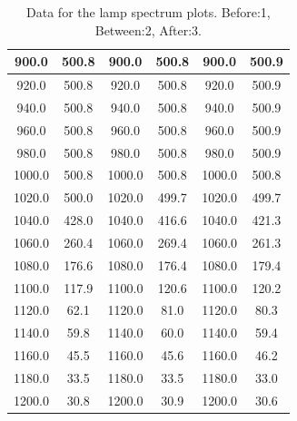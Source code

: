 \documentclass[]{article}
\begin{document}
\begin{table}[H]
\begin{tabular}{|c|c||c|c||c|c|}
900.0 & 500.8 & 900.0 & 500.8 & 900.0 & 500.9 \\ \hline
920.0 & 500.8 & 920.0 & 500.8 & 920.0 & 500.9 \\ \hline
940.0 & 500.8 & 940.0 & 500.8 & 940.0 & 500.9 \\ \hline
960.0 & 500.8 & 960.0 & 500.8 & 960.0 & 500.9 \\ \hline
980.0 & 500.8 & 980.0 & 500.8 & 980.0 & 500.9 \\ \hline
1000.0 & 500.8 & 1000.0 & 500.8 & 1000.0 & 500.8 \\ \hline
1020.0 & 500.0 & 1020.0 & 499.7 & 1020.0 & 499.7 \\ \hline
1040.0 & 428.0 & 1040.0 & 416.6 & 1040.0 & 421.3 \\ \hline
1060.0 & 260.4 & 1060.0 & 269.4 & 1060.0 & 261.3 \\ \hline
1080.0 & 176.6 & 1080.0 & 176.4 & 1080.0 & 179.4 \\ \hline
1100.0 & 117.9 & 1100.0 & 120.6 & 1100.0 & 120.2 \\ \hline
1120.0 & 62.1 & 1120.0 & 81.0 & 1120.0 & 80.3 \\ \hline
1140.0 & 59.8 & 1140.0 & 60.0 & 1140.0 & 59.4 \\ \hline
1160.0 & 45.5 & 1160.0 & 45.6 & 1160.0 & 46.2 \\ \hline
1180.0 & 33.5 & 1180.0 & 33.5 & 1180.0 & 33.0 \\ \hline
1200.0 & 30.8 & 1200.0 & 30.9 & 1200.0 & 30.6 \\ \hline
\hline
\end{tabular}
\caption{Data for the lamp spectrum plots. Before:1, Between:2, After:3. }
\end{table}
\end{document}

